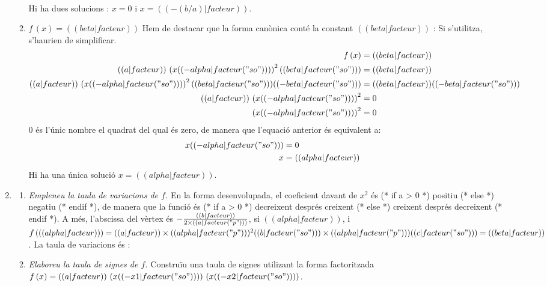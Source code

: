 \begin{enumerate}
\begin{enumerate}
\begin{align*}
\end{align*}
Hi ha dues solucions : $x=0$ i $x=(( -(b/a)|facteur ))$.
\item $f\,(x)=(( beta|facteur ))$ Hem de destacar que la forma canònica conté la constant $(( beta|facteur ))$ : Si s'utilitza, s'haurien de simplificar.
\begin{align*}
f\,(x) &= (( beta|facteur)) \\
(( a|facteur )) \,\left( x (( -alpha|facteur("so") )) \right)^2 (( beta|facteur("so") )) &= (( beta|facteur ))\\
(( a|facteur )) \,\left( x (( -alpha|facteur("so") )) \right)^2 (( beta|facteur("so") )) (( -beta|facteur("so") )) &= (( beta|facteur )) (( -beta|facteur("so") ))\\
(( a|facteur )) \,\left( x (( -alpha|facteur("so") )) \right)^2 &= 0\\
\left( x (( -alpha|facteur("so") )) \right)^2 &= 0\\
\end{align*}
$0$ és l'únic nombre el quadrat del qual és zero, de manera que l'equació anterior és equivalent a:
\begin{align*}
x (( -alpha|facteur("so") )) &= 0\\
x &= (( alpha|facteur )) \\
\end{align*}
Hi ha una única solució $x=(( alpha|facteur ))$.
\end{enumerate}
\item
\begin{enumerate}
\item \emph{Empleneu la taula de variacions de $f$.} En la forma desenvolupada, el coeficient davant de $x^2$ és 
(* if a > 0 *) positiu (* else *) negatiu (* endif *),
de manera que la funció és 
(* if a > 0 *) decreixent després creixent (* else *) creixent després decreixent (* endif *).
A més, l'abscissa del vèrtex és $-\frac{(( b|facteur ))}{2\times{}(( a|facteur("p") ))}$, si $(( alpha|facteur ))$, i
$f\,( (( alpha|facteur )) )=(( a|facteur ))\times{}(( alpha|facteur("p") ))^2 (( b|facteur("so") ))\times{} (( alpha|facteur("p") )) (( c|facteur("so") ))=(( beta|facteur ))$.
La taula de variacions és :
\begin{center}
\end{center}
\item \emph{Elaboreu la taula de signes de $f$.} Construïu una taula de signes utilizant la forma factoritzada $f\,(x)=(( a|facteur )) \,\left(x (( -x1|facteur("so") ))\right) \, \left(x (( -x2|facteur("so") ))\right)$.


\end{enumerate}
\end{enumerate}

